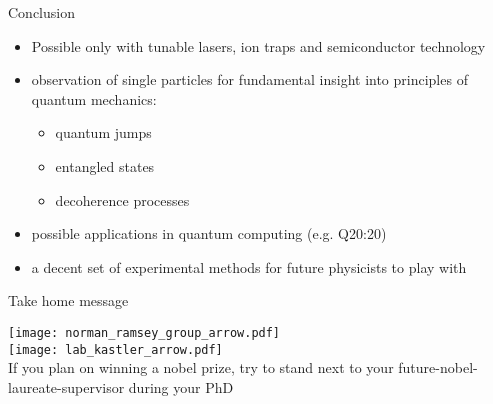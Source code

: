 \begin{frame}[t]{Conclusion}
  \begin{itemize}
    \item<1-> Possible only with tunable lasers, ion traps and semiconductor
      technology
    \item<2-> observation of single particles for fundamental insight into
      principles of quantum mechanics:
      \begin{itemize}
        \item quantum jumps
        \item entangled states
        \item decoherence processes
      \end{itemize}
    \item<3-> possible applications in quantum computing (e.g. Q20:20)
    \item<4> a decent set of experimental methods for future physicists to play
      with
  \end{itemize}
\end{frame}

\begin{frame}[t]{Take home message}
  \begin{center}
    \texttt{[image: norman\_ramsey\_group\_arrow.pdf]}\\
    \texttt{[image: lab\_kastler\_arrow.pdf]}\\
    \vspace{0.1cm}
    If you plan on winning a nobel prize, try to stand next to your
    future-nobel-laureate-supervisor during your PhD
  \end{center}

\end{frame}
